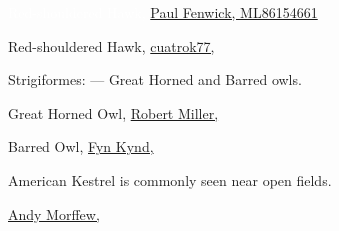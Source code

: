 \documentclass[t]{beamer}
\begin{document}
{
\begin{frame}


\tinyfill \textcolor{white}{Red-shouldered Hawk, \href{https://macaulaylibrary.org/asset/86154661}{Paul Fenwick, ML86154661}}
\end{frame}
}

{
\begin{frame}


\tinyfill Red-shouldered Hawk, \href{https://flickr.com/photos/cuatrok77/8535844534}{cuatrok77, }
\end{frame}
}


{
\begin{frame}{Strigiformes:  — Great Horned and Barred owls.}


\vfilll 



\tiny \colorbox[gray]{0.9}{\parbox{0.3\textwidth}{Great Horned Owl,  \href{https://flickr.com/photos/12463666@N03/32547241817}{Robert Miller, }}}
 \hfill Barred Owl, \href{https://flickr.com/photos/79452129@N02/30833383633}{Fyn Kynd, }
\end{frame}
}

{
\begin{frame}{American Kestrel is commonly seen near open fields.}


\tinyfill \href{https://commons.wikimedia.org/wiki/File:American_Kestrel_(Male)_(8238822396).jpg}{Andy Morffew, }
\end{frame}
}
\end{document}
